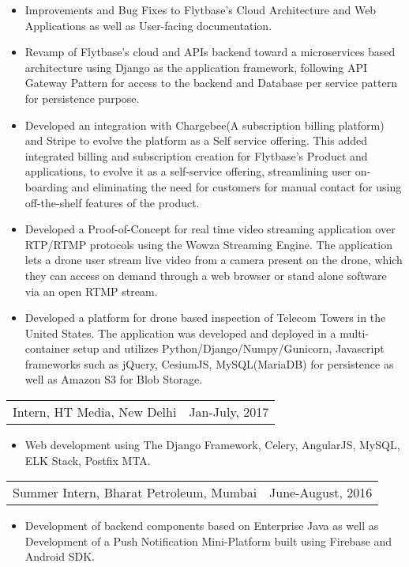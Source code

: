 \documentclass[margin]{res}
\begin{document}
\begin{resume}
\begin{itemize}
\begin{itemize}
	                  \item Improvements and Bug Fixes to Flytbase's Cloud Architecture and Web Applications as well as User-facing documentation.
	                  \item Revamp of Flytbase's cloud and APIs backend toward a microservices based architecture using Django as the application framework, following API Gateway Pattern for access to the backend and Database per service pattern for persistence purpose.
										\item Developed an integration with Chargebee(A subscription billing platform) and Stripe to evolve the platform as a Self service offering. This added integrated billing and subscription creation for Flytbase's Product and applications, to evolve it as a self-service offering, streamlining user on-boarding and eliminating the need for customers for manual contact for using off-the-shelf features of the product.
	                  \item Developed a Proof-of-Concept for real time video streaming application over RTP/RTMP protocols using the Wowza Streaming Engine.
	                  The application lets a drone user stream live video from a camera present on the drone, which they can access on demand through a web browser or stand alone software via an open RTMP stream.
	                  \item Developed a platform for drone based inspection of Telecom Towers in the United States. The application was developed and deployed in a multi-container setup and utilizes Python/Django/Numpy/Gunicorn, Javascript
                  	frameworks such as jQuery, CesiumJS, MySQL(MariaDB) for persistence as well as Amazon S3 for Blob Storage.
	            	\end{itemize}
				       	\end{itemize}
				        \begin{tabular}{p{4in} r}
	                Intern, HT Media, New Delhi & Jan-July, 2017
				        \end{tabular}
						  	\begin{itemize}
                 \item[] Web development using The Django Framework, Celery, AngularJS, MySQL, ELK Stack, Postfix MTA.
                \end{itemize}
	              \begin{tabular}{p{3.8in} r} %
	               Summer Intern, Bharat Petroleum, Mumbai &  June-August, 2016
	              \end{tabular}
                \begin{itemize}
                 \item[] Development of backend components based on Enterprise Java as well as Development of a Push Notification Mini-Platform built using Firebase and Android SDK.
                \end{itemize}

\end{resume}
\end{document}

